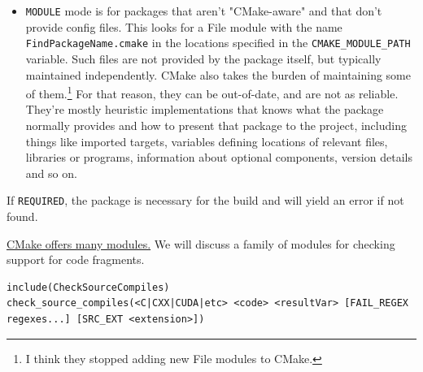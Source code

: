 \documentclass[table, xcdraw]{article}%
\begin{document}
\begin{itemize}
\begin{itemize}
    \item \texttt{MODULE} mode is for packages that aren't "CMake-aware" and that don't provide config files. This looks for a File module with the name \texttt{FindPackageName.cmake} in the locations specified in the \texttt{CMAKE_MODULE_PATH} variable. Such files are not provided by the package itself, but typically maintained independently. CMake also takes the burden of maintaining some of them.\footnote{I think they stopped adding new File modules to CMake.} For that reason, they can be out-of-date, and are not as reliable. They're mostly heuristic implementations that knows what the package normally provides and how to present that package to the project, including things like imported targets, variables defining locations of relevant files, libraries or programs, information about optional components, version details and so on.
\end{itemize}

If \texttt{REQUIRED}, the package is necessary for the build and will yield an error if not found.
\end{itemize}

\href{https://cmake.org/cmake/help/latest/manual/cmake-modules.7.html}{CMake offers many modules.} We will discuss a family of modules for checking support for code fragments.

\begin{verbatim}
include(CheckSourceCompiles)
check_source_compiles(<C|CXX|CUDA|etc> <code> <resultVar> [FAIL_REGEX regexes...] [SRC_EXT <extension>])
\end{verbatim}
\end{document}
